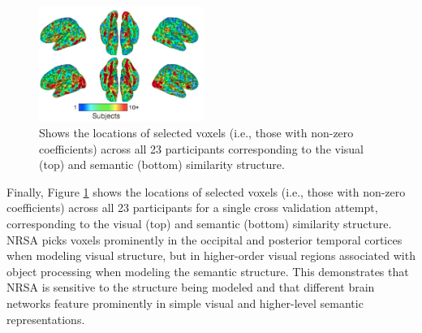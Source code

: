 \begin{figure}[!h]
\centering
\includegraphics[width=0.48\textwidth]{figures/vissem.png}%
\caption{Shows the locations of selected voxels (i.e., those with non-zero coefficients) across all 23 participants corresponding to the visual (top) and semantic (bottom) similarity structure. }
\label{fig.vissem}
\end{figure}

Finally, Figure \ref{fig.vissem} shows the locations of selected voxels (i.e., those with
non-zero coefficients) across all 23 participants for a single cross validation attempt,
corresponding to the visual (top) and semantic (bottom) similarity structure. NRSA picks
voxels prominently in the occipital and posterior temporal cortices when modeling visual
structure, but in higher-order visual regions associated with object processing when
modeling the semantic structure. This demonstrates that NRSA is sensitive to the structure
being modeled and that different brain networks feature prominently in simple visual and
higher-level semantic representations.
